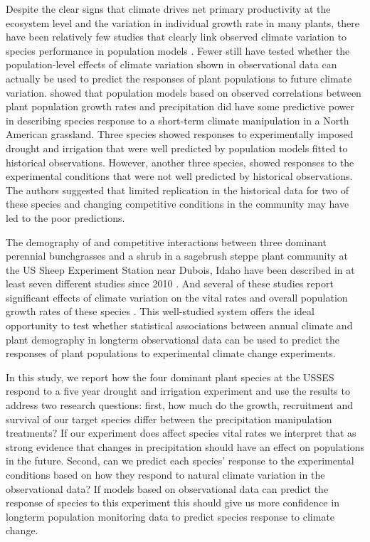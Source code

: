 \documentclass[11pt]{article}
\begin{document}
\begin{doublespacing}
Despite the clear signs that climate drives net primary productivity at the ecosystem level and the variation in individual growth rate in many plants, there have been relatively few studies that clearly link observed climate variation to species performance in population models \citep{ehrlen_advancing_2016}. Fewer still have tested whether the population-level effects of climate variation shown in observational data can actually be used to predict the responses of plant populations to future climate variation. \citep{adler_can_2013} showed that population models based on observed correlations between plant population growth rates and precipitation did have some predictive power in describing species response to a short-term climate manipulation in a North American grassland. Three species showed responses to experimentally imposed drought and irrigation that were well predicted by population models fitted to historical observations.  However, another three species, showed responses to the experimental conditions that were not well predicted by historical observations. The authors suggested that limited replication in the historical data for two of these species and changing competitive conditions in the community may have led to the poor predictions.  

The demography of and competitive interactions between three dominant perennial bunchgrasses and a shrub in a sagebrush steppe plant community at the US Sheep Experiment Station near Dubois, Idaho have been described in at least seven different studies since 2010 \citep{adler_coexistence_2010,adler_forecasting_2012,adler_weak_2009,adler_weak_2016,chu_direct_2016,chu_large_2015,dalgleish_climate_2010}. And several of these studies report significant effects of climate variation on the vital rates and overall population growth rates of these species \citep{dalgleish_climate_2010,adler_forecasting_2012,adler_weak_2009,chu_direct_2016}. This well-studied system offers the ideal opportunity to test whether statistical associations between annual climate and plant demography in longterm observational data can be used to predict the responses of plant populations to experimental climate change experiments.  

In this study, we report how the four dominant plant species at the USSES respond to a five year drought and irrigation experiment and use the results to address two research questions: first, how much do the growth, recruitment and survival of our target species differ between the precipitation manipulation treatments? If our experiment does affect species vital rates we interpret that as strong evidence that changes in precipitation should have an effect on populations in the future. Second, can we predict each species' response to the experimental conditions based on how they respond to natural climate variation in the observational data? If models based on observational data can predict the response of species to this experiment this should give us more confidence in longterm population monitoring data to predict species response to climate change. 


\end{doublespacing}
\end{document}
